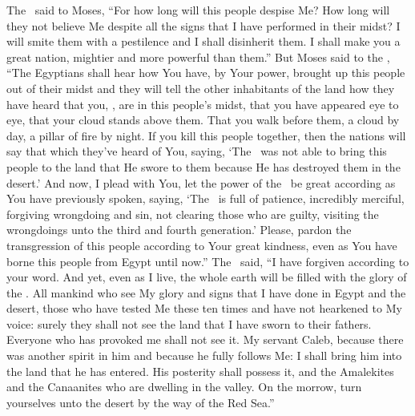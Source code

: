 \begin{inparaenum}
   The \lord\ said to Moses, ``For how long will this people despise Me? How long will they not believe Me despite all the signs that I have performed in their midst?%
   I will smite them with a pestilence and I shall disinherit them. I shall make you a great nation, mightier and more powerful than them.''%
   But Moses said to the \lord, ``The Egyptians shall hear how You have, by Your power, brought up this people out of their midst%
   and they will tell the other inhabitants of the land how they have heard that you, \lord, are in this people's midst, that you have appeared eye to eye, that your cloud stands above them. That you walk before them, a cloud by day, a pillar of fire by night.%
   If you kill this people together, then the nations will say that which they've heard of You, saying,%
   `The \lord\ was not able to bring this people to the land that He swore to them because He has destroyed them in the desert.'%
   And now, I plead with You, let the power of the \lord\ be great according as You have previously spoken, saying,%
   `The \lord\ is full of patience, incredibly merciful, forgiving wrongdoing and sin, not clearing those who are guilty, visiting the wrongdoings unto the third and fourth generation.'%
   Please, pardon the transgression of this people according to Your great kindness, even as You have borne this people from Egypt until now.''%
   The \lord\ said, ``I have forgiven according to your word.%
   And yet, even as I live, the whole earth will be filled with the glory of the \lord.%
   All mankind who see My glory and signs that I have done in Egypt and the desert, those who have tested Me these ten times and have not hearkened to My voice:%
   surely they shall not see the land that I have sworn to their fathers. Everyone who has provoked me shall not see it.%
   My servant Caleb, because there was another spirit in him and because he fully follows Me: I shall bring him into the land that he has entered. His posterity shall possess it,%
   and the Amalekites and the Canaanites who are dwelling in the valley. On the morrow, turn yourselves unto the desert by the way of the Red Sea.''%


\end{inparaenum}
